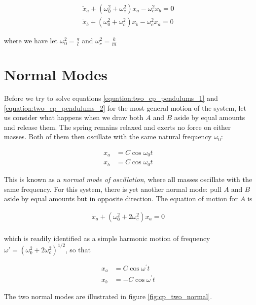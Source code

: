 \documentclass[a4paper,10pt]{article}
\begin{document}
\begin{align}
\label{equation:two_cp_pendulums_1}
\ddot x_a + (\omega_0^{2} + \omega_c^{2})x_a - \omega_c^{2}x_b= 0\\
\label{equation:two_cp_pendulums_2}
\ddot x_b + (\omega_0^{2} + \omega_c^{2})x_b - \omega_c^{2}x_a= 0
\end{align}

where we have let $\omega_0^2 = \frac{g}{l}$ and  $\omega_c^2 = \frac{k}{m}$

\section{Normal Modes}

Before we try to solve equations \ref{equation:two_cp_pendulums_1} and \ref{equation:two_cp_pendulums_2} for the most general motion of the system,
let us consider what happens when we draw both $A$ and $B$ aside by equal amounts and release them. The spring remains relaxed and exerts no force
on either masses. Both of them then oscillate with the same natural frequency $\omega_0$:

\begin{align*}
x_a &= C\cos{\omega_0t}\\
x_b &= C\cos{\omega_0t}
\end{align*}

This is known as a \textit{normal mode of oscillation}, where all masses oscillate with the same frequency. For this system, there is yet another
normal mode: pull $A$ and $B$ aside by equal amounts but in opposite direction. The equation of motion for $A$ is 

\begin{align*}
\ddot x_a + (\omega_0^{2} + 2\omega_c^{2})x_a = 0\\
\end{align*}

which is readily identified as a simple harmonic motion of frequency $\omega\prime = (\omega_0^2 + 2\omega_c^2)^{1/2}$, so that

\begin{align*}
x_a &= C\cos{\omega^{'}t}\\
x_b &= -C\cos{\omega^{'}t}
\end{align*}

The two normal modes are illustrated in figure \ref{fig:cp_two_normal}.
\end{document}
